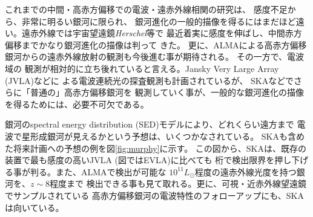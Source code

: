 これまでの中間・高赤方偏移での電波・遠赤外線相関の研究は、
感度不足から、非常に明るい銀河に限られ、
銀河進化の一般的描像を得るにはまだほど遠い。遠赤外線では宇宙望遠鏡\textit{Herschel}等で
最近着実に感度を伸ばし、中間赤方偏移までかなり銀河進化の描像は判って
きた\citep{2014MNRAS.441.1017R}。
更に、ALMAによる高赤方偏移銀河からの遠赤外線放射の観測も今後進む事が期待される。
その一方で、電波域の
観測が相対的に立ち後れていると言える。Jansky Very Large Array (JVLA)などに
よる電波連続光の探査観測も計画されているが\citep{2014arXiv1401.4018J}、
SKAなどでさらに「普通の」高赤方偏移銀河を
観測していく事が、一般的な銀河進化の描像を得るためには、必要不可欠である。

銀河のspectral energy distribution (SED)モデルにより、どれくらい遠方まで
電波で星形成銀河が見えるかという予想は、いくつかなされている\citep{2001PASP..113..586T2}。
SKAも含めた将来計画への予想の例を図\ref{fig:murphy}に示す。
この図から、SKAは、既存の装置で最も感度の高いJVLA (図ではEVLA)に比べても
桁で検出限界を押し下げる事が判る。また、ALMAで検出が可能な
$10^{11}L_\odot$程度の遠赤外線光度を持つ銀河を、$z\sim 8$程度まで
検出できる事も見て取れる。更に、可視・近赤外線望遠鏡でサンプルされている
高赤方偏移銀河の電波特性のフォローアップにも、SKAは向いている。

